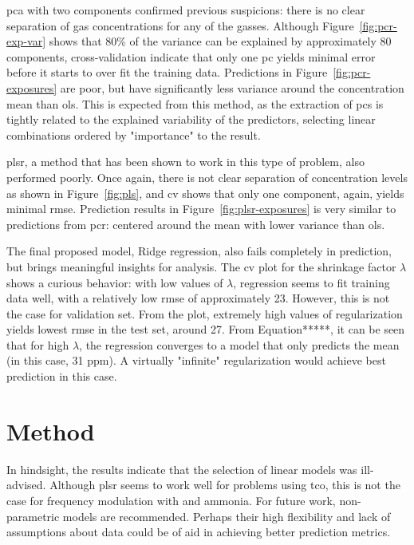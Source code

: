 \acrshort{pca} with two components confirmed previous suspicions: there is no clear separation of gas concentrations for any of the gasses. Although Figure~\ref{fig:pcr-exp-var} shows that 80\% of the variance can be explained by approximately 80 components, cross-validation indicate that only one \acrshort{pc} yields minimal error before it starts to over fit the training data. Predictions in Figure~\ref{fig:pcr-exposures} are poor, but have significantly less variance around the concentration mean than \acrshort{ols}. This is expected from this method, as the extraction of \acrshort{pc}s is tightly related to the explained variability of the predictors, selecting linear combinations ordered by "importance" to the result.

\acrshort{plsr}, a method that has been shown to work in this type of problem, also performed poorly. Once again, there is not clear separation of concentration levels as shown in Figure~\ref{fig:pls}, and \acrshort{cv} shows that only one component, again, yields minimal \acrshort{rmse}. Prediction results in Figure~\ref{fig:plsr-exposures} is very similar to predictions from \acrshort{pcr}: centered around the mean with lower variance than \acrshort{ols}.

The final proposed model, Ridge regression, also fails completely in prediction, but brings meaningful insights for analysis. The \acrshort{cv} plot for the shrinkage factor $\lambda$ shows a curious behavior: with low values of $\lambda$, regression seems to fit training data well, with a relatively low \acrshort{rmse} of approximately 23. However, this is not the case for validation set. From the plot, extremely high values of regularization yields lowest \acrshort{rmse} in the test set, around 27. From Equation*****, it can be seen that for high $\lambda$, the regression converges to a model that only predicts the mean (in this case, 31 ppm). A virtually "infinite" regularization would achieve best prediction in this case.

\section{Method}
\label{sec:discussion-method}

In hindsight, the results indicate that the selection of linear models was ill-advised. Although \acrshort{plsr} seems to work well for problems using \acrshort{tco}, this is not the case for frequency modulation with \nox and ammonia. For future work, non-parametric models are recommended. Perhaps their high flexibility and lack of assumptions about data could be of aid in achieving better prediction metrics.

